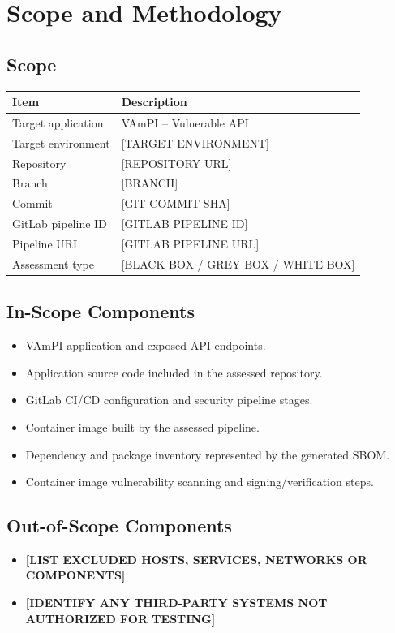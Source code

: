 \documentclass[11pt,a4paper]{report}
\newcommand{\TargetEnvironment}{[TARGET ENVIRONMENT]}
\newcommand{\TargetApplication}{VAmPI -- Vulnerable API}
\newcommand{\TestingType}{[BLACK BOX / GREY BOX / WHITE BOX]}
\newcommand{\CommitSHA}{[GIT COMMIT SHA]}
\newcommand{\PipelineID}{[GITLAB PIPELINE ID]}
\newcommand{\PipelineURL}{[GITLAB PIPELINE URL]}
\newcommand{\RepositoryURL}{[REPOSITORY URL]}
\newcommand{\BranchName}{[BRANCH]}
\newcommand{\placeholder}[1]{\textbf{[#1]}}
\begin{document}
\chapter{Scope and Methodology}

\section{Scope}
\begin{tabularx}{\textwidth}{@{}p{43mm}Y@{}}
    \toprule
    \textbf{Item} & \textbf{Description} \\
    \midrule
    Target application & \TargetApplication \\
    Target environment & \TargetEnvironment \\
    Repository & \RepositoryURL \\
    Branch & \BranchName \\
    Commit & \CommitSHA \\
    GitLab pipeline ID & \PipelineID \\
    Pipeline URL & \PipelineURL \\
    Assessment type & \TestingType \\
    \bottomrule
\end{tabularx}

\section{In-Scope Components}
\begin{itemize}
    \item VAmPI application and exposed API endpoints.
    \item Application source code included in the assessed repository.
    \item GitLab CI/CD configuration and security pipeline stages.
    \item Container image built by the assessed pipeline.
    \item Dependency and package inventory represented by the generated SBOM.
    \item Container image vulnerability scanning and signing/verification steps.
\end{itemize}

\section{Out-of-Scope Components}
\begin{itemize}
    \item \placeholder{LIST EXCLUDED HOSTS, SERVICES, NETWORKS OR COMPONENTS}
    \item \placeholder{IDENTIFY ANY THIRD-PARTY SYSTEMS NOT AUTHORIZED FOR TESTING}
\end{itemize}
\end{document}

